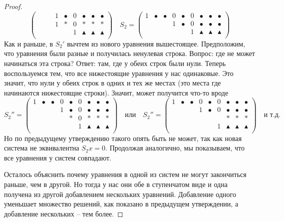 \begin{proof}
\[\begin{pmatrix}
{}&{}&{}&{1}&{\bullet}&{0}&{\bullet}&{\bullet}&{\bullet}\\
{}&{}&{}&{1}&{*}&{0}&{*}&{*}&{*}\\
{}&{}&{}&{}&{}&{1}&{\blacktriangle}&{\blacktriangle}&{\blacktriangle}\\
\end{pmatrix}\quad
S_2 = 
\begin{pmatrix}
{1}&{\bullet}&{\bullet}&{0}&{\bullet}&{0}&{\bullet}&{\bullet}&{\bullet}\\
{}&{}&{}&{1}&{\bullet}&{0}&{\bullet}&{\bullet}&{\bullet}\\
{}&{}&{}&{}&{}&{1}&{\blacktriangle}&{\blacktriangle}&{\blacktriangle}\\
\end{pmatrix}
\]
Как и раньше, в $S_2'$ вычтем из нового уравнения вышестоящее.
Предположим, что уравнения были разные и получилась ненулевая строка.
Вопрос: где не может начинаться эта строка?
Ответ: там, где у обеих строк были нули.
Теперь воспользуемся тем, что все нижестоящие уравнения у нас одинаковые.
Это значит, что нули у обеих строк в одних и тех же местах (это места где начинаются нижестоящие строки).
Значит, может получится что-то вроде
\[
S_2'' = 
\begin{pmatrix}
{1}&{\bullet}&{\bullet}&{0}&{\bullet}&{0}&{\bullet}&{\bullet}&{\bullet}\\
{}&{}&{}&{1}&{\bullet}&{0}&{\bullet}&{\bullet}&{\bullet}\\
{}&{}&{}&{}&{*}&{0}&{*}&{*}&{*}\\
{}&{}&{}&{}&{}&{1}&{\blacktriangle}&{\blacktriangle}&{\blacktriangle}\\
\end{pmatrix}\quad\text{или}\quad
S_2'' = 
\begin{pmatrix}
{1}&{\bullet}&{\bullet}&{0}&{\bullet}&{0}&{\bullet}&{\bullet}&{\bullet}\\
{}&{}&{}&{1}&{\bullet}&{0}&{\bullet}&{\bullet}&{\bullet}\\
{}&{}&{}&{}&{}&{}&{*}&{*}&{*}\\
{}&{}&{}&{}&{}&{1}&{\blacktriangle}&{\blacktriangle}&{\blacktriangle}\\
\end{pmatrix}\quad\text{и т.д.}
\]
Но по предыдущему утверждению такого опять быть не может, так как новая система не эквивалентна $S_2 x = 0$.
Продолжая аналогично, мы показываем, что все уравнения у систем совпадают.

Осталось объяснить почему уравнения в одной из систем не могут закончиться раньше, чем в другой.
Но тогда у нас они обе в ступенчатом виде и одна получена из другой добавлением нескольких уравнений.
Добавление одного уменьшает множество решений, как показано в предыдущем утверждении, а добавление нескольких -- тем более.
\end{proof}

